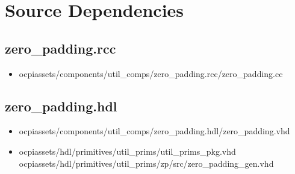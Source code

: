 \documentclass{article}
\def\comp{zero\_padding}
\begin{document}
\section*{Source Dependencies}
\subsection*{\comp.rcc}
\begin{itemize}
	\item ocpiassets/components/util\_comps/zero\_padding.rcc/zero\_padding.cc
\end{itemize}
\subsection*{\comp.hdl}
\begin{itemize}
	\item ocpiassets/components/util\_comps/zero\_padding.hdl/zero\_padding.vhd
	\item ocpiassets/hdl/primitives/util\_prims/util\_prims\_pkg.vhd
	      \subitem ocpiassets/hdl/primitives/util\_prims/zp/src/zero\_padding\_gen.vhd
\end{itemize}
\end{document}
